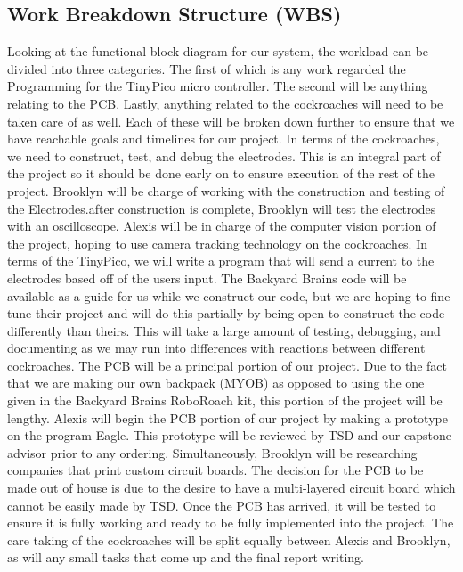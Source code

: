 \documentclass[twocolumn,10pt]{IEEEtran}
\begin{document}
\subsection{Work Breakdown Structure (WBS)}
Looking at the functional block diagram for our system, the workload can be divided into three categories. The first of which is any work regarded the Programming for the TinyPico micro controller. The second will be anything relating to the PCB. Lastly, anything related to the cockroaches will need to be taken care of as well. Each of these will be broken down further to ensure that we have reachable goals and timelines for our project. In terms of the cockroaches, we need to construct, test, and debug the electrodes. This is an integral part of the project so it should be done early on to ensure execution of the rest of the project. Brooklyn will be charge of working with the construction and testing of the Electrodes.after construction is complete, Brooklyn will test the electrodes with an oscilloscope. Alexis will be in charge of the computer vision portion of the project, hoping to use camera tracking technology on the cockroaches. In terms of the TinyPico, we will write a program that will send a current to the electrodes based off of the users input. The Backyard Brains code will be available as a guide for us while we construct our code, but we are hoping to fine tune their project and will do this partially by being open to construct the code differently than theirs. This will take a large amount of testing, debugging, and documenting as we may run into differences with reactions between different cockroaches. The PCB will be a principal portion of our project. Due to the fact that we are making our own backpack (MYOB) as opposed to using the one given in the Backyard Brains RoboRoach kit, this portion of the project will be lengthy. Alexis will begin the PCB portion of our project by making a prototype on the program Eagle. This prototype will be reviewed by TSD and our capstone advisor prior to any ordering. Simultaneously, Brooklyn will be researching companies that print custom circuit boards. The decision for the PCB to be made out of house is due to the desire to have a multi-layered circuit board which cannot be easily made by TSD. Once the PCB has arrived, it will be tested to ensure it is fully working and ready to be fully implemented into the project. The care taking of the cockroaches will be split equally between Alexis and Brooklyn, as will any small tasks that come up and the final report writing.  
\end{document}
